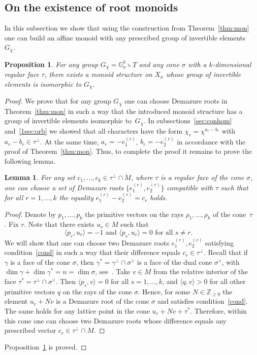 \documentclass[a4paper, 11pt]{amsart}
\theoremstyle{plain}
\newtheorem{lemma}[theorem]{Lemma}
\newtheorem{proposition}[theorem]{Proposition}
\theoremstyle{remark}
\theoremstyle{definition}
\newcommand{\ZZ}{\mathbb{Z}}
\newcommand{\G}{\mathbb{G}}
\newcommand{\GG}{G_{\overline{\chi}}}
\begin{document}
\subsection{On the existence of root monoids}
In this subsection we show that using the construction from Theorem~\ref{thm:mon} one can build an affine monoid with any prescribed group of invertible elements $\GG$. 	
\begin{proposition}\label{prop:exist}
	For any group $\GG = \G_a^k \leftthreetimes T$ and any cone $\sigma$ with a $k$-dimensional regular face $\tau$, there exists a monoid structure on $X_\sigma$ whose group of invertible elements is isomorphic to $\GG$. 
\end{proposition}

\begin{proof}
We prove that for any group $\GG$ one can choose Demazure roots in Theorem~\ref{thm:mon} in such a way that the introduced monoid structure has a group of invertible elements isomorphic to~$\GG$. In subsections~\ref{sec:conhom} and~\ref{1sec:orb} we showed that all characters have the form $\chi_r = \chi^{a_r - b_r}$ with $a_r - b_r \in \tau^\perp$. At the same time, $a_r = -e_1^{(r)}$, $b_r = -e_2^{(r)}$ in accordance with the proof of Theorem~\ref{thm:mon}. Thus, to complete the proof it remains to prove the following lemma.
\begin{lemma}
	For any set $c_1, \ldots, c_k \in \tau^\perp \cap M$, where $\tau$ is a regular face of the cone $\sigma$, one can choose a set of Demazure roots $\{ e_1^{(r)}, e_2^{(r)} \}$ compatible with $\tau$ such that for all $r = 1, \ldots, k$ the equality $e_1^{(r)} - e_2^{(r)} = c_r$ holds.
\end{lemma}
\begin{proof}
	Denote by $p_1, \ldots, p_k$ the primitive vectors on the rays $\rho_1, \ldots, \rho_k$ of the cone~$\tau$. Fix $r$. Note that there exists $u_r \in M$ such that 
	\begin{equation}\label{cond}
		\langle p_r, u_r \rangle  = -1 \text{ and } \langle p_s, u_r \rangle  = 0 \text{ for all } s \neq r. 
	\end{equation}
	We will show that one can choose two Demazure roots $e_1^{(r)}, e_2^{(r)}$ satisfying condition~\eqref{cond} in such a way that their difference equals $c_r \in \tau^\perp$. Recall that if $\gamma$ is a face of the cone $\sigma$, then $\gamma^* = \gamma^\perp \cap \sigma^\vee$ is a face of the dual cone $\sigma^\vee$, with $\dim \gamma + \dim \gamma^* = n = \dim \sigma$, see~\cite[Proposition 1.2.10]{F}. Take $v \in M$ from the relative interior of the face $\tau^* = \tau^\perp \cap \sigma^\vee$. Then $\langle p_s, v \rangle = 0$ for all $s = 1, \ldots, k$, and $\langle q, v \rangle > 0$ for all other primitive vectors $q$ on the rays of the cone $\sigma$. Hence, for some $N \in \ZZ_{\geq 0}$ the element $u_r + Nv$ is a Demazure root of the cone $\sigma$ and satisfies condition~\eqref{cond}. The same holds for any lattice point in the cone $u_r + Nv + \tau^*$. Therefore, within this cone one can choose two Demazure roots whose difference equals any prescribed vector $c_r \in \tau^\perp \cap M$. 
\end{proof}
Proposition~\ref{prop:exist} is proved.
\end{proof}
\end{document}
